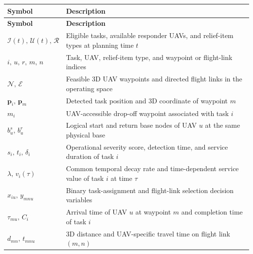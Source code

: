 \clearpage  %


	



\begingroup
\small
\setlength{\tabcolsep}{5pt}
\renewcommand{\arraystretch}{1.15}
\begin{longtable}{p{3.5cm} p{10cm}}
\textbf{Symbol} & \textbf{Description} \\ \hline
\endfirsthead
\textbf{Symbol} & \textbf{Description} \\ \hline
\endhead
$\mathcal{I}(t),\,\mathcal{U}(t),\,\mathcal{R}$
& Eligible tasks, available responder UAVs, and relief-item types at planning time $t$ \\
$i,\,u,\,r,\,m,\,n$
& Task, UAV, relief-item type, and waypoint or flight-link indices \\
$\mathcal{N},\,\mathcal{E}$
& Feasible 3D UAV waypoints and directed flight links in the operating space \\
$\mathbf{p}_i,\,\mathbf{p}_m$
& Detected task position and 3D coordinate of waypoint $m$ \\
$m_i$
& UAV-accessible drop-off waypoint associated with task $i$ \\
$b_u^{s},\,b_u^{r}$
& Logical start and return base nodes of UAV $u$ at the same physical base \\
$s_i,\,t_i,\,\delta_i$
& Operational severity score, detection time, and service duration of task $i$ \\
$\lambda,\,v_i(\tau)$
& Common temporal decay rate and time-dependent service value of task $i$ at time $\tau$ \\
$x_{iu},\,y_{mnu}$
& Binary task-assignment and flight-link selection decision variables \\
$\tau_{mu},\,C_i$
& Arrival time of UAV $u$ at waypoint $m$ and completion time of task $i$ \\
$d_{mn},\,t_{mnu}$
& 3D distance and UAV-specific travel time on flight link $(m,n)$ \\

\end{longtable}
